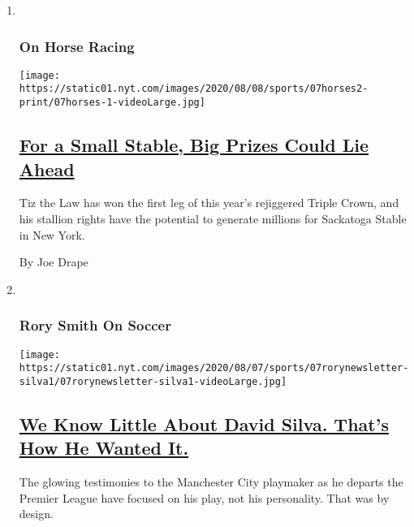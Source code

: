 \begin{enumerate}
\def\labelenumi{\arabic{enumi}.}
\item ~
  \hypertarget{on-horse-racing}{%
  \subsubsection{On Horse Racing}\label{on-horse-racing}}

  \texttt{[image: https://static01.nyt.com/images/2020/08/08/sports/07horses2-print/07horses-1-videoLarge.jpg]}

  \hypertarget{for-a-small-stable-big-prizes-could-lie-ahead}{%
  \subsection{\texorpdfstring{\href{/2020/08/07/sports/tiz-the-law-millions.html}{For
  a Small Stable, Big Prizes Could Lie
  Ahead}}{For a Small Stable, Big Prizes Could Lie Ahead}}\label{for-a-small-stable-big-prizes-could-lie-ahead}}

  Tiz the Law has won the first leg of this year's rejiggered Triple
  Crown, and his stallion rights have the potential to generate millions
  for Sackatoga Stable in New York.

  By Joe Drape
\item ~
  \hypertarget{rory-smith-on-soccer}{%
  \subsubsection{Rory Smith On Soccer}\label{rory-smith-on-soccer}}

  \texttt{[image: https://static01.nyt.com/images/2020/08/07/sports/07rorynewsletter-silva1/07rorynewsletter-silva1-videoLarge.jpg]}

  \hypertarget{we-know-little-about-david-silva-thats-how-he-wanted-it}{%
  \subsection{\texorpdfstring{\href{/2020/08/07/sports/soccer/david-silva-manchester-city.html}{We
  Know Little About David Silva. That's How He Wanted
  It.}}{We Know Little About David Silva. That's How He Wanted It.}}\label{we-know-little-about-david-silva-thats-how-he-wanted-it}}

  The glowing testimonies to the Manchester City playmaker as he departs
  the Premier League have focused on his play, not his personality. That
  was by design.


\end{enumerate}
